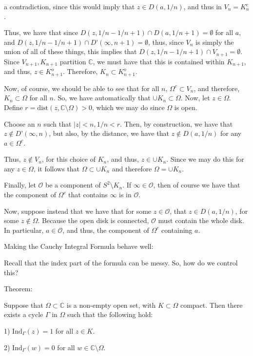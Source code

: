 \documentclass[10pt]{article}
\begin{document}
a contradiction, since this would imply that $z \in D(a, 1/n)$, and thus in $V_n = K_n^c$. 

Thus, we have that since $D(z,1/n - 1/n+1) \cap D(a, 1/n+1) = \emptyset$ for all $a$, and $D(z,1/n - 1/n+1) \cap D’(\infty, n+1) = \emptyset$, thus, since $V_n$ is simply the union of all of these things, this implies that $D(z, 1/n - 1/n+1) \cap V_{n+1} = \emptyset$. Since $V_{n+1}, K_{n+1}$ partition $\mathbb{C}$, we must have that this is contained within $K_{n+1}$, and thus, $z \in K_{n+1}^o$. Therefore, $K_n \subset K_{n+1}^o$. 

Now, of course, we should be able to see that for all $n$, $\Omega^c \subset V_n$, and therefore, $K_n \subset \Omega$ for all $n$. So, we have automatically that $\cup K_n \subset \Omega$. Now, let $z \in \Omega$. Define $r = \text{dist}(z, \mathbb{C} \setminus \Omega ) > 0$, which we may do since $\Omega$ is open.

Choose an $n$ such that $|z| < n, 1/n < r$. Then, by construction, we have that $ z \not \in D’(\infty, n)$, but also, by the distance, we have that $z \not \in D(a,1/n)$ for any $a \in \Omega^c$. 

Thus, $z \not \in V_n$, for this choice of $K_n$, and thus, $z \in \cup K_n$. Since we may do this for any $z \in \Omega$, it follows that $\Omega \subset \cup K_n$ and therefore $\Omega = \cup K_n$.

Finally, let $\mathcal{O}$ be a component of $S^2 \setminus K_n$. If $\infty\in \mathcal{O}$, then of course we have that the component of $\Omega^c$ that contains $\infty$ is in $\mathcal{O}$. 

Now, suppose instead that we have that for some $z \in \mathcal{O}$, that $z \in D(a, 1/n)$, for some $z \not \in \Omega$. Because the open disk is connected, $\mathcal{O}$ must contain the whole disk. In particular, $a \in \mathcal{O}$, and thus, the component of $\Omega^c$ containing $a$. 

Making the Cauchy Integral Formula behave well:

Recall that the index part of the formula can be messy. So, how do we control this?

Theorem:

Suppose that $\Omega \subset \mathbb{C}$ is a non-empty open set, with $K \subset \Omega$ compact. Then there exists a cycle $\Gamma$ in $\Omega$ such that the following hold:

1) $\text{Ind}_\Gamma(z) = 1$ for all $z \in K$.

2) $\text{Ind}_\Gamma(w) = 0$ for all $w \in \mathbb{C} \setminus \Omega$.
\end{document}
